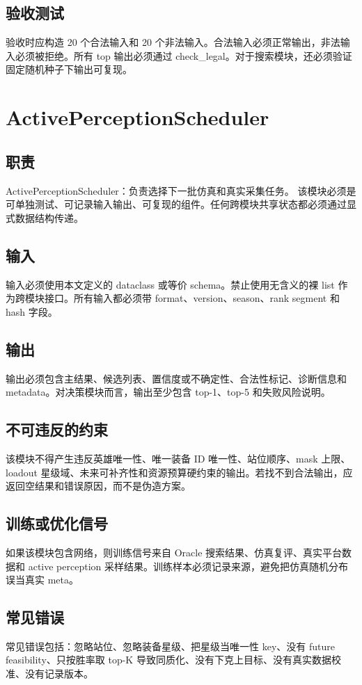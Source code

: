 \documentclass[UTF8,12pt,openany]{ctexbook}
\begin{document}
\subsection{验收测试}
验收时应构造 20 个合法输入和 20 个非法输入。合法输入必须正常输出，非法输入必须被拒绝。所有 top 输出必须通过 check\_legal。对于搜索模块，还必须验证固定随机种子下输出可复现。

\section{ActivePerceptionScheduler}
\subsection{职责}
ActivePerceptionScheduler：负责选择下一批仿真和真实采集任务。 该模块必须是可单独测试、可记录输入输出、可复现的组件。任何跨模块共享状态都必须通过显式数据结构传递。

\subsection{输入}
输入必须使用本文定义的 dataclass 或等价 schema。禁止使用无含义的裸 list 作为跨模块接口。所有输入都必须带 format、version、season、rank segment 和 hash 字段。

\subsection{输出}
输出必须包含主结果、候选列表、置信度或不确定性、合法性标记、诊断信息和 metadata。对决策模块而言，输出至少包含 top-1、top-5 和失败风险说明。

\subsection{不可违反的约束}
该模块不得产生违反英雄唯一性、唯一装备 ID 唯一性、站位顺序、mask 上限、loadout 星级域、未来可补齐性和资源预算硬约束的输出。若找不到合法输出，应返回空结果和错误原因，而不是伪造方案。

\subsection{训练或优化信号}
如果该模块包含网络，则训练信号来自 Oracle 搜索结果、仿真复评、真实平台数据和 active perception 采样结果。训练样本必须记录来源，避免把仿真随机分布误当真实 meta。

\subsection{常见错误}
常见错误包括：忽略站位、忽略装备星级、把星级当唯一性 key、没有 future feasibility、只按胜率取 top-K 导致同质化、没有下克上目标、没有真实数据校准、没有记录版本。
\end{document}
